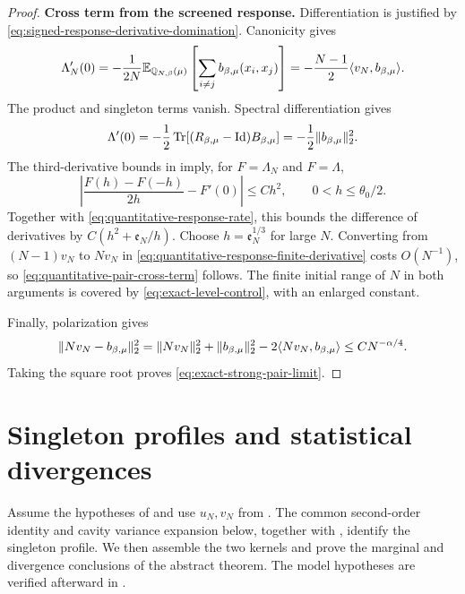 \documentclass[11pt,reqno]{amsart}
\numberwithin{equation}{section}
\theoremstyle{plain}
\theoremstyle{remark}
\DeclarePairedDelimiter{\norm}{\lVert}{\rVert}
\DeclarePairedDelimiter{\ipp}{\langle}{\rangle}
\newcommand{\E}{{\mathbb{E}}}
\newcommand{\Q}{{\mathbb{Q}}}
\newcommand{\be}{\beta}
\DeclareMathOperator{\Tr}{Tr}
\newcommand{\step}[1]{\par\medskip\noindent\textbf{#1}}
\begin{document}
\begin{proof}
\step{Cross term from the screened response.}
Differentiation is justified by
\eqref{eq:signed-response-derivative-domination}.  Canonicity gives
\begin{equation}\label{eq:quantitative-response-finite-derivative}
 \Lambda_N'(0)
 =-\frac1{2N}\E_{\Q_{N,\be}(\mu)}
       \left[\sum_{i\ne j}b_{\be,\mu}(x_i,x_j)\right]
 =-\frac{N-1}{2}\ipp*{v_N,b_{\be,\mu}}.
\end{equation}
The product and singleton terms vanish.  Spectral differentiation gives
\begin{equation}\label{eq:quantitative-response-limit-derivative}
 \Lambda'(0)=-\frac12\Tr[(R_{\be,\mu}-\mathrm{Id})B_{\be,\mu}]
 =-\frac12\norm{b_{\be,\mu}}_2^2.
\end{equation}
The third-derivative bounds in 
imply, for $F=\Lambda_N$ and $F=\Lambda$,
\begin{equation}\label{eq:signed-centered-response-difference}
 \left|\frac{F(h)-F(-h)}{2h}-F'(0)\right|\leq Ch^2,
 \qquad 0<h\leq\theta_0/2.
\end{equation}
Together with \eqref{eq:quantitative-response-rate}, this bounds the
difference of derivatives by $C(h^2+\mathfrak e_N/h)$.  Choose
$h=\mathfrak e_N^{1/3}$ for large $N$.  Converting from $(N-1)v_N$ to
$Nv_N$ in \eqref{eq:quantitative-response-finite-derivative} costs
$O(N^{-1})$, so \eqref{eq:quantitative-pair-cross-term} follows.
The finite initial range of $N$ in both arguments is covered by
\eqref{eq:exact-level-control}, with an enlarged constant.

Finally, polarization gives
\begin{equation}\label{eq:quantitative-pair-polarization}
 \norm{Nv_N-b_{\be,\mu}}_2^2
 =\norm{Nv_N}_2^2+\norm{b_{\be,\mu}}_2^2
             -2\ipp*{Nv_N,b_{\be,\mu}}\leq C N^{-\alpha/4}.
\end{equation}
Taking the square root proves \eqref{eq:exact-strong-pair-limit}.
\end{proof}

\section{Singleton profiles and statistical divergences}
\label{sec:singleton-quantitative-limits}

Assume the hypotheses of  and
use $u_N,v_N$ from .
The common second-order identity and cavity variance expansion below,
together with , identify the singleton
profile.  We then assemble the two kernels and prove the marginal and
divergence conclusions of the abstract theorem.  The model hypotheses are verified afterward in .
\end{document}
